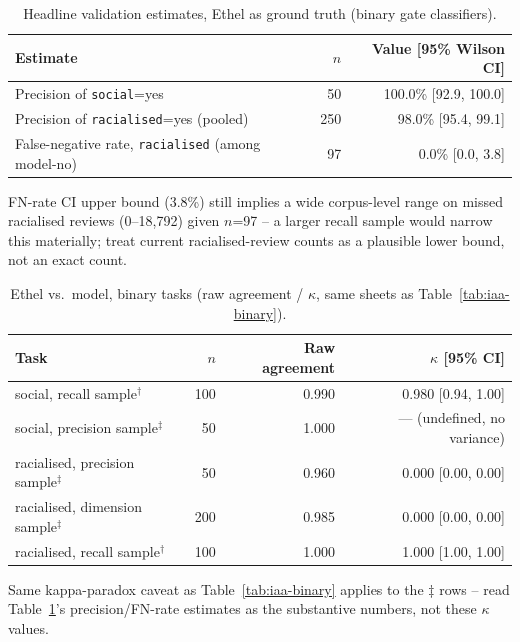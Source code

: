 \begin{table}[htbp]
\centering
\footnotesize
\setlength{\tabcolsep}{4pt}
\caption{Headline validation estimates, Ethel as ground truth (binary gate classifiers).}
\label{tab:validation-headline}
\begin{tabular}{@{} l r r @{}}
\toprule
Estimate & $n$ & Value [95\% Wilson CI] \\
\midrule
Precision of \texttt{social}=yes & 50 & 100.0\% [92.9, 100.0] \\
Precision of \texttt{racialised}=yes (pooled) & 250 & 98.0\% [95.4, 99.1] \\
False-negative rate, \texttt{racialised} (among model-no) & 97 & 0.0\% [0.0, 3.8] \\
\bottomrule
\end{tabular}

\vspace{2pt}
\raggedright\footnotesize
FN-rate CI upper bound (3.8\%) still implies a wide corpus-level range on missed racialised reviews (0--18,792) given $n$=97 -- a larger recall sample would narrow this materially; treat current racialised-review counts as a plausible lower bound, not an exact count.
\end{table}

\begin{table}[htbp]
\centering
\footnotesize
\setlength{\tabcolsep}{4pt}
\caption{Ethel vs.\ model, binary tasks (raw agreement / $\kappa$, same sheets as Table~\ref{tab:iaa-binary}).}
\label{tab:validation-binary}
\begin{tabular}{@{} l r r r @{}}
\toprule
Task & $n$ & Raw agreement & $\kappa$ [95\% CI] \\
\midrule
social, recall sample$^{\dagger}$ & 100 & 0.990 & 0.980 [0.94, 1.00] \\
social, precision sample$^{\ddagger}$ & 50 & 1.000 & --- (undefined, no variance) \\
racialised, precision sample$^{\ddagger}$ & 50 & 0.960 & 0.000 [0.00, 0.00] \\
racialised, dimension sample$^{\ddagger}$ & 200 & 0.985 & 0.000 [0.00, 0.00] \\
racialised, recall sample$^{\dagger}$ & 100 & 1.000 & 1.000 [1.00, 1.00] \\
\bottomrule
\end{tabular}

\vspace{2pt}
\raggedright\footnotesize
Same kappa-paradox caveat as Table~\ref{tab:iaa-binary} applies to the $\ddagger$ rows -- read Table~\ref{tab:validation-headline}'s precision/FN-rate estimates as the substantive numbers, not these $\kappa$ values.
\end{table}

